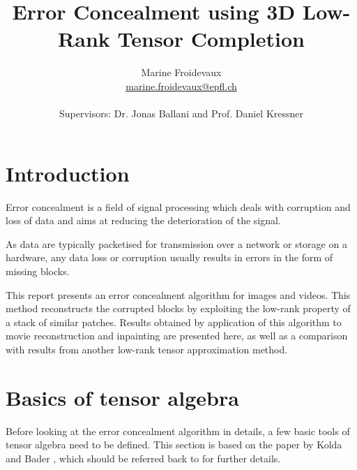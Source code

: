 \documentclass[a4paper, 11pt]{article} %
\newcommand{\mail}[1]{{\href{mailto:#1}{#1}}}
\begin{document}
\title{Error Concealment using 3D Low-Rank Tensor Completion}%
\author{Marine Froidevaux \\ \mail{marine.froidevaux@epfl.ch} \\ \\Supervisors: Dr. Jonas Ballani and Prof. Daniel Kressner 
 }%



\maketitle
%
\thispagestyle{empty}
\setcounter{tocdepth}{2} %
\tableofcontents
\newpage
{}



\section{Introduction}
Error concealment is a field of signal processing which deals with corruption and loss of data and aims at reducing the deterioration of the signal.

As data are typically packetised for transmission over a network  or storage on a hardware, any data loss or corruption usually results in errors in the form of missing blocks.

This report presents an error concealment algorithm for images and videos. This method reconstructs the corrupted blocks by exploiting the low-rank property of a stack of similar patches. Results obtained by application of this algorithm to movie reconstruction and inpainting are presented here, as well as a comparison with results from another low-rank tensor approximation method.

\section{Basics of tensor algebra}
Before looking at the error concealment algorithm in details, a few basic tools of tensor algebra need to be defined.
This section is based on the paper by Kolda and Bader \cite{Kolda-Bader}, which should be referred back to for further details.
\end{document}
